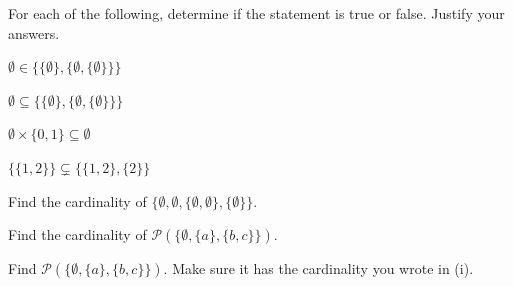 \documentclass[12pt]{exam}
\begin{document}
\begin{qparts}
    \item For each of the following, determine if the statement is true or false. Justify your answers.
    \begin{qsubparts}
        \item $\emptyset \in \{\{\emptyset\}, \{\emptyset , \{\emptyset\}\}\}$
        \item $\emptyset \subseteq \{\{\emptyset\}, \{\emptyset , \{\emptyset\}\}\}$
        \item $\emptyset \times  \{0,1\} \subseteq \emptyset$
        \item $\{\{1, 2\}\} \subsetneq \{ \{1,2\}, \{2\} \}$
    \end{qsubparts}

    \item Find the cardinality of $\{\emptyset, \emptyset, \{\emptyset, \emptyset\}, \{\emptyset\}\}.$

    \item
        \begin{qsubparts}
        \item Find the cardinality of $\mathcal{P}(\{\emptyset, \{a\}, \{b, c\}\})$.
        \item Find $\mathcal{P}(\{\emptyset, \{a\}, \{b, c\}\})$. Make sure it has the cardinality you wrote in (i).

    \end{qsubparts}

\end{qparts}
\end{document}
